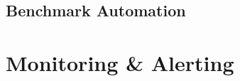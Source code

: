 




% 


\subsection{Benchmark Automation}\label{sec:benchmark:automation}




% 


\section{Monitoring \& Alerting}\label{sec:benchmark:alerting}

